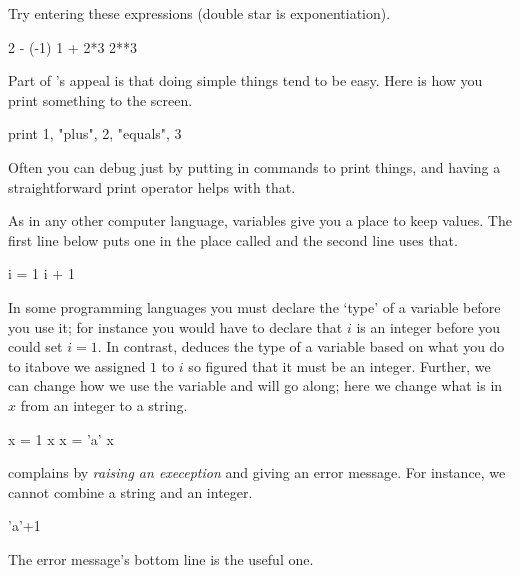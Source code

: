 Try entering these expressions (double star is exponentiation).
\begin{pythonoutput}
2 - (-1)
1 + 2*3
2**3  
\end{pythonoutput}

Part of \python's appeal is that doing simple things tend to be easy.
Here is how you print something to the screen.
\begin{pythonoutput}
print 1, "plus", 2, "equals", 3
\end{pythonoutput}
Often you can debug just by putting in commands to print things, 
and having a straightforward print operator helps with that. 

As in any other computer language, variables give you a place to keep values.
The first line below puts one in the place called 
and the second line uses that.
\begin{pythonoutput}
i = 1
i + 1
\end{pythonoutput}
In some programming languages you must declare the `type' of a variable
before you use it; for instance you would have to declare 
that $i$ is an integer before you could set $i=1$.
In contrast, \python{} deduces the type of a variable 
based on what you do to it\Dash above we assigned $1$ to $i$ 
so \python{} figured that it must be an integer.
Further, we can change how we use the variable and \python{} will 
go along; here we change what is in $x$ from an integer to a string.
\begin{pythonoutput}
x = 1
x
x = 'a'
x
\end{pythonoutput}

\python{} complains by \textit{raising an exeception} and giving an error 
message.
For instance, we cannot combine a string and an integer. 
\begin{pythonoutput}
'a'+1
\end{pythonoutput}
\noindent The error message's bottom line is the useful one.

